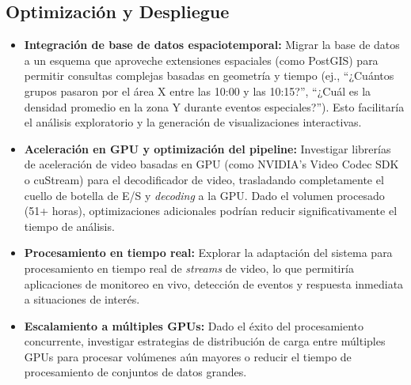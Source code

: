 \subsection{Optimización y Despliegue}
\begin{itemize}
	\item \textbf{Integración de base de datos espaciotemporal:} Migrar la base de datos a un esquema que aproveche extensiones espaciales (como PostGIS) para permitir consultas complejas basadas en geometría y tiempo (ej., ``¿Cuántos grupos pasaron por el área X entre las 10:00 y las 10:15?'', ``¿Cuál es la densidad promedio en la zona Y durante eventos especiales?''). Esto facilitaría el análisis exploratorio y la generación de visualizaciones interactivas.
	
	\item \textbf{Aceleración en GPU y optimización del pipeline:} Investigar librerías de aceleración de video basadas en GPU (como NVIDIA's Video Codec SDK o cuStream) para el decodificador de video, trasladando completamente el cuello de botella de E/S y \textit{decoding} a la GPU. Dado el volumen procesado (51+ horas), optimizaciones adicionales podrían reducir significativamente el tiempo de análisis.
	
	\item \textbf{Procesamiento en tiempo real:} Explorar la adaptación del sistema para procesamiento en tiempo real de \textit{streams} de video, lo que permitiría aplicaciones de monitoreo en vivo, detección de eventos y respuesta inmediata a situaciones de interés.
	
	\item \textbf{Escalamiento a múltiples GPUs:} Dado el éxito del procesamiento concurrente, investigar estrategias de distribución de carga entre múltiples GPUs para procesar volúmenes aún mayores o reducir el tiempo de procesamiento de conjuntos de datos grandes.
\end{itemize}


